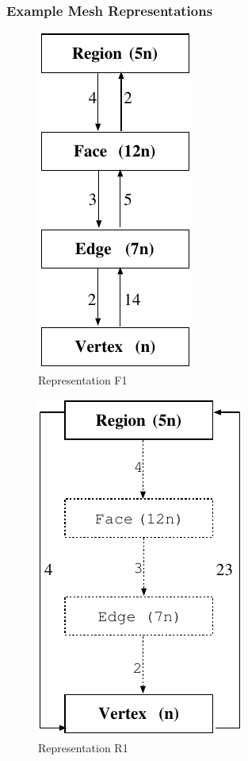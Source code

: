 \documentclass{beamer}
\begin{document}
\begin{frame}
\frametitle{Example Mesh Representations}

\begin{figure}[!ht]
  \begin{center}
    \begin{minipage}{2.525in}
      \begin{center}
        \includegraphics[scale=0.9]{figures/repF1} \\
        Representation F1
      \end{center}
    \end{minipage}
    \begin{minipage}{1.75in}
      \begin{center}
        \includegraphics[scale=0.9]{figures/repR1} \\
        Representation R1
      \end{center}
    \end{minipage}
  \end{center}
  \label{fig:reptypes}
\end{figure}

\end{frame}
\end{document}
